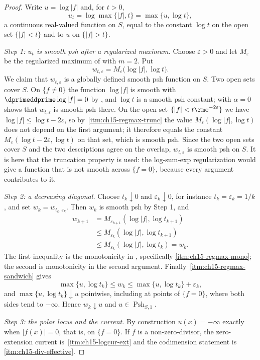 \begin{proof}
Write $u=\log|f|$ and, for $t>0$,
\[
 u_t=\log\max\{|f|,t\}=\max\{u,\log t\},
\]
a continuous real-valued function on $S$, equal to the constant $\log t$ on
the open set $\{|f|<t\}$ and to $u$ on $\{|f|>t\}$.

\emph{Step 1: $u_t$ is smooth psh after a regularized maximum.}  Choose
$\varepsilon>0$ and let $M_\varepsilon$ be the regularized maximum of
 with $m=2$.  Put
\[
 w_{t,\varepsilon}=M_\varepsilon\bigl(\log|f|,\log t\bigr).
\]
We claim that $w_{t,\varepsilon}$ is a globally defined smooth psh function
on $S$.  Two open sets cover $S$.  On $\{f\neq0\}$ the function $\log|f|$ is
smooth with $\dprimeddprime\log|f|=0$ by , and
$\log t$ is a smooth psh constant;  with
$\alpha=0$ shows that $w_{t,\varepsilon}$ is smooth psh there.  On the open
set $\{|f|<t\rme^{-2\varepsilon}\}$ we have
$\log|f|\le\log t-2\varepsilon$, so by
\,\cref{itm:ch15-regmax-trunc} the value
$M_\varepsilon(\log|f|,\log t)$ does not depend on the first argument;
it therefore equals the constant $M_\varepsilon(\log t-2\varepsilon,\log t)$
on that set, which is smooth psh.  Since the two open sets cover $S$ and the
two descriptions agree on the overlap, $w_{t,\varepsilon}$ is smooth psh on
$S$.  It is here that the truncation property is used: the log-sum-exp
regularization would give a function that is not smooth across $\{f=0\}$,
because every argument contributes to it.

\emph{Step 2: a decreasing diagonal.}  Choose $t_k\downarrow0$ and
$\varepsilon_k\downarrow0$, for instance $t_k=\varepsilon_k=1/k$, and set
$w_k=w_{t_k,\varepsilon_k}$.  Then $w_k$ is smooth psh by Step 1, and
\[
 \begin{aligned}
  w_{k+1}
   &=M_{\varepsilon_{k+1}}(\log|f|,\log t_{k+1})\\
   &\le M_{\varepsilon_k}(\log|f|,\log t_{k+1})\\
   &\le M_{\varepsilon_k}(\log|f|,\log t_k)=w_k .
 \end{aligned}
\]
The first inequality is the monotonicity in ,
specifically \cref{itm:ch15-regmax-mono}; the second is monotonicity in the
second argument.  Finally
\,\cref{itm:ch15-regmax-sandwich} gives
\[
 \max\{u,\log t_k\}\le w_k\le\max\{u,\log t_k\}+\varepsilon_k ,
\]
and $\max\{u,\log t_k\}\downarrow u$ pointwise, including at points of
$\{f=0\}$, where both sides tend to $-\infty$.  Hence $w_k\downarrow u$ and
$u\in\operatorname{Psh}_{S,1}$.

\emph{Step 3: the polar locus and the current.}  By construction
$u(x)=-\infty$ exactly when $|f(x)|=0$, that is, on $\{f=0\}$.  If $f$ is a
non-zero-divisor, the zero-extension current is
\,\cref{itm:ch15-logcur-ext} and the codimension
statement is
\,\cref{itm:ch15-div-effective}.
\end{proof}

